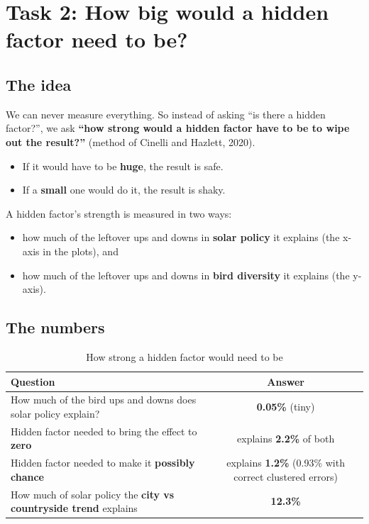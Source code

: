 \documentclass[11pt]{article}
\begin{document}
\section{Task 2: How big would a hidden factor need to be?}

\subsection{The idea}
We can never measure everything. So instead of asking ``is there a hidden factor?'', we ask \textbf{``how strong would a hidden factor have to be to wipe out the result?''} (method of Cinelli and Hazlett, 2020).
\begin{itemize}
\item If it would have to be \textbf{huge}, the result is safe.
\item If a \textbf{small} one would do it, the result is shaky.
\end{itemize}
A hidden factor's strength is measured in two ways:
\begin{itemize}
\item how much of the leftover ups and downs in \textbf{solar policy} it explains (the x-axis in the plots), and
\item how much of the leftover ups and downs in \textbf{bird diversity} it explains (the y-axis).
\end{itemize}

\subsection{The numbers}
\begin{table}[H]\centering\small
\caption{How strong a hidden factor would need to be}
\begin{tabularx}{\linewidth}{>{\raggedright\arraybackslash}Xc}
\toprule
Question & Answer\\
\midrule
How much of the bird ups and downs does solar policy explain? & \textbf{0.05\%} (tiny)\\
Hidden factor needed to bring the effect to \textbf{zero} & explains \textbf{2.2\%} of both\\
Hidden factor needed to make it \textbf{possibly chance} & explains \textbf{1.2\%} (0.93\% with correct clustered errors)\\
How much of solar policy the \textbf{city vs countryside trend} explains & \textbf{12.3\%}\\
\bottomrule
\end{tabularx}
\end{table}
\end{document}
